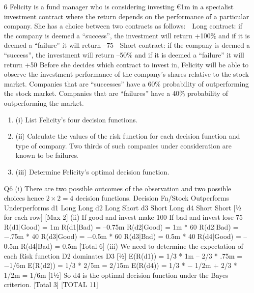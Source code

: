 \documentclass[a4paper,12pt]{article}
\begin{document}
6 Felicity is a fund manager who is considering investing €1m in a specialist
investment contract where the return depends on the performance of a particular
company. She has a choice between two contracts as follows:
   Long contract: if the company is deemed a “success”, the investment will return
+100\% and if it is deemed a “failure” it will return –75%
 Short contract: if the company is deemed a “success”, the investment will return
–50\% and if it is deemed a “failure” it will return +50%
Before she decides which contract to invest in, Felicity will be able to observe the
investment performance of the company’s shares relative to the stock market.
Companies that are “successes” have a 60\% probability of outperforming the stock
market. Companies that are “failures” have a 40\% probability of outperforming the
market.
\begin{enumerate}

\item (i) List Felicity’s four decision functions. 
\item (ii) Calculate the values of the risk function for each decision function and type
of company. 
Two thirds of such companies under consideration are known to be failures.
\item (iii) Determine Felicity’s optimal decision function. 
\end{enumerate}
\newpage 
Q6 (i) There are two possible outcomes of the observation and two possible choices
hence $2 \times 2 = 4$ decision functions.
Decision Fn/Stock Outperforms Underperforms
d1 Long Long
d2 Long Short
d3 Short Long
d4 Short Short
[½ for each row]
[Max 2]
(ii) If good and invest make 100%
If bad and invest lose 75%
R(d1|Good) = 1m
R(d1|Bad) = –0.75m 
R(d2|Good) = 1m * 60%
R(d2|Bad) = −.75m * 40%
R(d3|Good) = −0.5m * 60%
R(d3|Bad) = 0.5m * 40%
R(d4|Good) = –0.5m
R(d4|Bad) = 0.5m 
[Total 6]
(iii) We need to determine the expectation of each Risk function
D2 dominates D3 [½]
E(R(d1)) = 1/3 * 1m – 2/3 * .75m = −1/6m
E(R(d2)) = 1/3 * 2/5m = 2/15m
E(R(d4)) = 1/3 * − 1/2m + 2/3 * 1/2m = 1/6m [1½]
So d4 is the optimal decision function under the Bayes criterion. 
[Total 3]
[TOTAL 11]
\end{document}
